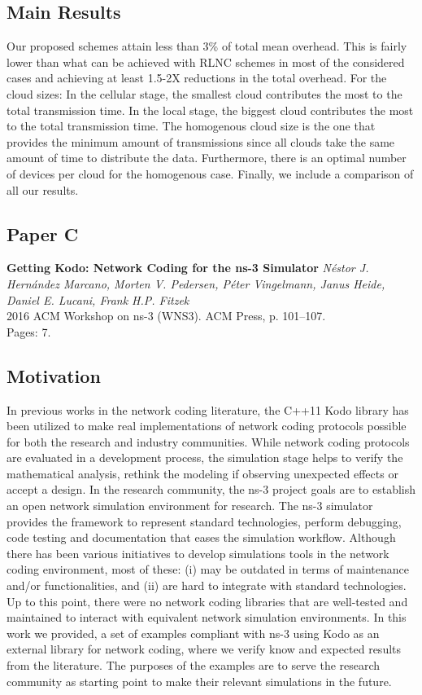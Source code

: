 \subsection*{Main Results}
Our proposed schemes attain less than 3\% of total mean overhead. This is fairly lower than what can be achieved with \ac{RLNC} schemes in most of the considered cases and achieving at least 1.5-2X reductions in the total overhead. For the cloud sizes: In the cellular stage, the smallest cloud contributes the most to the total transmission time. In the local stage, the biggest cloud contributes the most to the total transmission time. The homogenous cloud size is the one that provides the minimum amount of transmissions since all clouds take the same amount of time to distribute the data. Furthermore, there is an optimal number of devices per cloud for the homogenous case. Finally, we include a comparison of all our results. 

\clearpage


\subsection{Paper C}
\textbf{Getting Kodo: Network Coding for the ns-3 Simulator}
\textit{N\'estor J. Hern\'andez Marcano, Morten V. Pedersen, P\'eter
Vingelmann, Janus Heide, Daniel E. Lucani, Frank H.P. Fitzek}
\\ 2016 ACM Workshop on ns-3 (WNS3). ACM Press, p. 101--107.
\\ Pages: 7.
\subsection*{Motivation}
In previous works in the network coding literature, the C++11 Kodo library has been utilized to make real implementations of network coding protocols possible for both the research and industry communities. While network coding protocols are evaluated in a development process, the simulation stage helps to verify the mathematical analysis, rethink the modeling if observing unexpected effects or accept a design. In the research community, the ns-3 project goals are to establish an open network simulation environment for research. The ns-3 simulator provides the framework to represent standard technologies, perform debugging, code testing and documentation that eases the simulation workflow. Although there has been various initiatives to develop simulations tools in the network coding environment, most of these: (i) may be outdated in terms of maintenance and/or functionalities, and (ii) are hard to integrate with standard technologies. Up to this point, there were no network coding libraries that are well-tested and maintained to interact with equivalent network simulation environments. In this work we provided, a set of examples compliant with ns-3 using Kodo as an external library for network coding, where we verify know and expected results from the literature. The purposes of the examples are to serve the research community as starting point to make their relevant simulations in the future.

